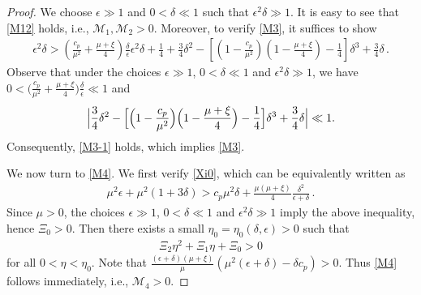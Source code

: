 \documentclass[reqno,11pt]{amsart}
\numberwithin{equation}{section}
\begin{document}
\begin{proof}
We choose $\epsilon \gg 1$ and $0 < \delta \ll 1$ such that $\epsilon^2 \delta \gg 1$. It is easy to see that \eqref{M12} holds, i.e., $\mathcal{M}_1, \mathcal{M}_2 > 0$. Moreover, to verify \eqref{M3}, it suffices to show
\begin{equation}\label{M3-1}
  \begin{aligned}
    \epsilon^2 \delta > ( \frac{c_p}{\mu^2} + \frac{\mu + \xi}{4} )  \frac{\delta}{\epsilon} \epsilon^2 \delta + \frac{1}{4} + \frac{3}{4} \delta^2 - [ (1 - \frac{c_p}{\mu^2}) ( 1 - \frac{\mu + \xi}{4} ) - \frac{1}{4} ] \delta^3 + \frac{3}{4} \delta \,.
  \end{aligned}
\end{equation}
Observe that under the choices $\epsilon \gg 1$, $0 < \delta \ll 1$ and $\epsilon^2 \delta \gg 1$, we have $0 < \bigl( \frac{c_p}{\mu^2} + \frac{\mu + \xi}{4} \bigr) \frac{\delta}{\epsilon} \ll 1$ and
\[
\Bigl| \frac{3}{4} \delta^2 - \Bigl[ \Bigl(1 - \frac{c_p}{\mu^2}\Bigr) \Bigl(1 - \frac{\mu + \xi}{4}\Bigr) - \frac{1}{4} \Bigr] \delta^3 + \frac{3}{4} \delta \Bigr| \ll 1.
\] 
Consequently, \eqref{M3-1} holds, which implies \eqref{M3}.

We now turn to \eqref{M4}. We first verify \eqref{Xi0}, which can be equivalently written as
\begin{equation*}
  \begin{aligned}
    \mu^2 \epsilon + \mu^2 ( 1 + 3 \delta) > c_p \mu^2 \delta + \frac{\mu (\mu + \xi)}{4} \frac{\delta^2}{\epsilon + \delta} \,.
  \end{aligned}
\end{equation*}
Since $\mu > 0$, the choices $\epsilon \gg 1$, $0 < \delta \ll 1$ and $\epsilon^2 \delta \gg 1$ imply the above inequality, hence $\Xi_0 > 0$. Then there exists a small $\eta_0 = \eta_0(\delta,\epsilon) > 0$ such that
\begin{equation*}
  \begin{aligned}
    \Xi_2 \eta^2 + \Xi_1 \eta + \Xi_0 > 0
  \end{aligned}
\end{equation*}
for all $0 < \eta < \eta_0$. Note that $\frac{(\epsilon + \delta) ( \mu + \xi )}{\mu} ( \mu^2 (\epsilon + \delta) - \delta c_p ) > 0$. Thus \eqref{M4} follows immediately, i.e., $\mathcal{M}_4 > 0$.


\end{proof}
\end{document}
